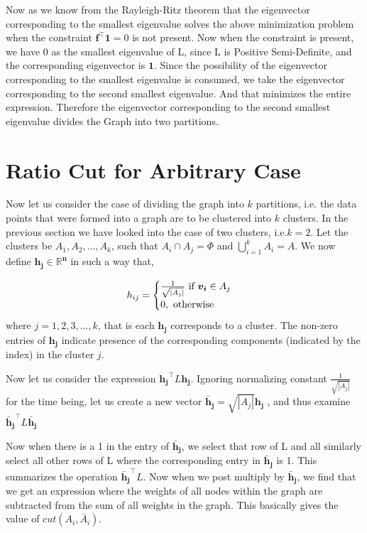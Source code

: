 \documentclass[english]{article}
\theoremstyle{plain}
\begin{document}
Now as we know from the Rayleigh-Ritz theorem that the eigenvector corresponding to the smallest eigenvalue solves the above minimization problem when the constraint $\boldsymbol{f}^{\top}\boldsymbol{1}=0$ is not present. Now when the constraint is present, we have 0 as the smallest eigenvalue of L, since L is Positive Semi-Definite, and the corresponding eigenvector is $\boldsymbol{1}$. Since the possibility of the eigenvector corresponding to the smallest eigenvalue is consumed, we take the eigenvector corresponding to the second smallest eigenvalue. And that minimizes the entire expression. Therefore the eigenvector corresponding to the second smallest eigenvalue divides the Graph into two partitions.

\section{Ratio Cut for Arbitrary Case}

Now let us consider the case of dividing the graph into $k$ partitions, i.e. the data points that were formed into a graph are to be clustered into $k$ clusters. In the previous section we have looked into the case of two clusters, i.e.$k = 2$. Let the clusters be $A_{1}, A_{2}, ..., A_{k}$, such that $A_{i} \cap A_{j} = \Phi$ and $\bigcup\limits_{i=1}^{k}A_{i}=A$. We now define $\boldsymbol{h_{j} \in \mathbb{R}^{n}}$ in such a way that,

\begin{equation}
h_{ij} = \begin{cases}
\frac{1}{\sqrt{\left|A_{j}\right|}} \textnormal{ if } \boldsymbol{v_{i}} \in A_{j} \\
0, \textnormal{ otherwise} \\
\end{cases}
\end{equation}
where $j=1,2,3,...,k$, that is each $\boldsymbol{h_{j}}$ corresponds to a cluster. The non-zero entries of $\boldsymbol{h_{j}}$ indicate presence of the corresponding components (indicated by the index) in the cluster $j$.

Now let us consider the expression  $\boldsymbol{h_{j}}^{\top}L\boldsymbol{h_{j}}$. Ignoring normalizing constant $\frac{1}{\sqrt{\left|A_{j}\right|}}$ for the time being, let us create a new vector $\boldsymbol{\bar{h}_{j}} = \sqrt{\left|A_{j}\right|} \boldsymbol{h_{j}}$ , and thus examine $\boldsymbol{\bar{h}_{j}}^{\top}L\boldsymbol{\bar{h}_{j}}$

Now when there is a 1 in the entry of $\boldsymbol{\bar{h}_{j}}$, we select that row of L and all similarly select all other rows of L where the corresponding entry in $\boldsymbol{\bar{h}_{j}}$ is 1.
This summarizes the operation $\boldsymbol{\bar{h}_{j}}^{\top}L$. Now when we post multiply by $\boldsymbol{\bar{h}_{j}}$, we find that we get an expression where the weights of all nodes within the graph are subtracted from the sum of all weights in the graph. This basically gives the value of $cut(A_{i},\bar{A}_{i})$.
\end{document}
